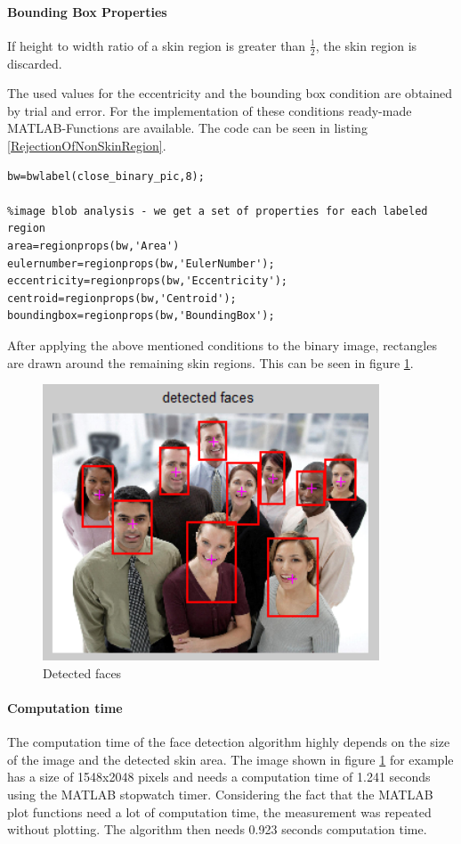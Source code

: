 \documentclass[SensorSystemsProject.tex]{subfiles}
\begin{document}
\paragraph{Bounding Box Properties} If height to width ratio of a skin region is greater than $\frac{1}{2}$, the skin region is discarded. 

\medskip
The used values for the eccentricity and the bounding box condition are obtained by trial and error. For the implementation of these conditions ready-made MATLAB-Functions are available. The code can be seen in listing  \ref{RejectionOfNonSkinRegion}.

\begin{lstlisting}[caption=Rejection of non Face Skin Region , label= RejectionOfNonSkinRegion]
%label all the connected components in the image
bw=bwlabel(close_binary_pic,8);

%image blob analysis - we get a set of properties for each labeled region
area=regionprops(bw,'Area')                    
eulernumber=regionprops(bw,'EulerNumber');      
eccentricity=regionprops(bw,'Eccentricity');    
centroid=regionprops(bw,'Centroid');            
boundingbox=regionprops(bw,'BoundingBox');
\end{lstlisting}

After applying the above mentioned conditions to the binary image, rectangles are drawn around the remaining skin regions. This can be seen in figure \ref{detectedFaces}.

\begin{figure}[!h]
\centering
\includegraphics[width=10cm]{./img/faceDetectionPicture/detectedFaces.png} 
\caption{Detected faces}
\label{detectedFaces}
\end{figure}

\paragraph{Computation time} The computation time of the face detection algorithm highly depends on the size of the image and the detected skin area. The image shown in figure \ref{detectedFaces} for example has a size of 1548x2048 pixels and needs a computation time of 1.241 seconds using the MATLAB stopwatch timer. 
Considering the fact that the MATLAB plot functions need a lot of computation time, the measurement was repeated without plotting. The algorithm then needs 0.923 seconds computation time.
\end{document}
